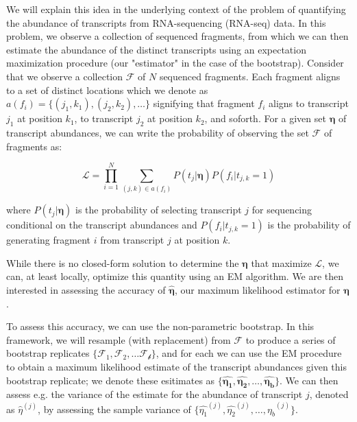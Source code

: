 We will explain this idea in the underlying context of the problem of quantifying the abundance 
of transcripts from RNA-sequencing (RNA-seq) data.  In this problem, we observe a collection of 
sequenced fragments, from which we can then estimate the abundance of the distinct transcripts 
using an expectation maximization procedure (our "estimator" in the case of the bootstrap).  
Consider that we observe a collection $\mathcal{F}$ of $N$ sequenced fragments. Each fragment aligns 
to a set of distinct locations which we denote as $a(f_i) = \{(j_1, k_1), (j_2, k_2), \dots\}$ 
signifying that fragment $f_i$ aligns to transcript $j_1$ at position $k_1$, to transcript $j_2$ 
at position $k_2$, and soforth.  For a given set $\mathbf{\eta}$ of transcript abundances, we can 
write the probability of observing the set $\mathcal{F}$ of fragments as:

$$
\mathcal{L} = \prod_{i=1}^{N} \sum_{(j,k) \in a(f_i)} P(t_j|\mathbf{\eta}) P(f_i|t_{j,k}=1)
$$

where $P(t_j|\mathbf{\eta})$ is the probability of selecting transcript $j$ for sequencing 
conditional on the transcript abundances and $P(f_i|t_{j,k}=1)$ is the probability of generating 
fragment $i$ from transcript $j$ at position $k$.


While there is no closed-form solution to determine the $\mathbf{\eta}$ that maximize $\mathcal{L}$, 
we can, at least locally, optimize this quantity using an EM algorithm.  We are then interested in 
assessing the accuracy of $\mathbf{\hat{\eta}}$, our maximum likelihood estimator for $\mathbf{\eta}$.

To assess this accuracy, we can use the non-parametric bootstrap. In this framework, we will 
resample (with replacement) from $\mathcal{F}$ to produce a series of bootstrap replicates 
$\{\mathcal{F_1}, \mathcal{F_2}, \dots \mathcal{F_b}\}$, and for each we can use the EM procedure 
to obtain a maximum likelihood estimate of the transcript abundances given this bootstrap replicate; 
we denote these esitimates as 
$\{\mathbf{\hat{\eta_1}}, \mathbf{\hat{\eta_2}}, \dots, \mathbf{\hat{\eta_b}}\}$. 
We can then assess e.g. the variance of the estimate for the abundance of transcript $j$, denoted as 
$\hat{\eta}^{(j)}$, by assessing the sample variance of 
$\{ \hat{\eta_1}^{(j)}, \hat{\eta_2}^{(j)}, \dots, \hat{\eta_b}^{(j)} \}$.

